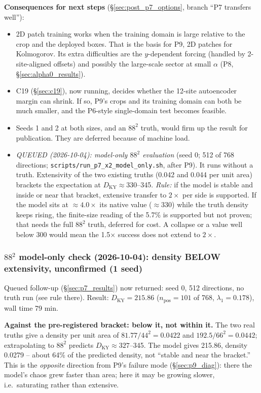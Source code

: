 \documentclass[11pt]{article}
\begin{document}
\textbf{Consequences for next steps} (\S\ref{sec:post_p7_options},
branch ``P7 transfers well''):
\begin{itemize}[leftmargin=*]
\item 2D patch training works when the training domain is large
  relative to the crop and the deployed boxes. That is the basis for
  P9, 2D patches for Kolmogorov. Its extra difficulties are the
  $y$-dependent forcing (handled by 2-site-aligned offsets) and possibly
  the large-scale sector at small $\alpha$ (P8, \S\ref{sec:alpha0_results}).
\item C19 (\S\ref{sec:c19}), now running, decides whether the 12-site
  autoencoder margin can shrink. If so, P9's crops and its training
  domain can both be much smaller, and the P6-style single-domain test
  becomes feasible.
\item Seeds 1 and 2 at both sizes, and an $88^2$ truth, would firm up
  the result for publication. They are deferred because of machine load.
\item \emph{QUEUED (2026-10-04): model-only $88^2$ evaluation} (seed 0;
  512 of 768 directions; \texttt{scripts/run\_p7\_x2\_model\_only.sh},
  after P9). It runs without a truth. Extensivity of the two existing
  truths (0.042 and 0.044 per unit area) brackets the expectation at
  $D_{\mathrm{KY}}\approx330$--345.
  \emph{Rule:} if the model is stable and inside or near that bracket,
  extensive transfer to $2\times$ per side is supported. If the model
  sits at $\approx 4.0\times$ its native value ($\approx 330$) while the
  truth density keeps rising, the finite-size reading of the 5.7\% is
  supported but not proven; that needs the full $88^2$ truth, deferred
  for cost. A collapse or a value well below 300 would mean the
  1.5$\times$ success does not extend to $2\times$.
\end{itemize}

\subsubsection{$88^2$ model-only check (2026-10-04): density BELOW extensivity, unconfirmed (1 seed)}
\label{sec:p7_88_check}

Queued follow-up (\S\ref{sec:p7_results}) now returned: seed 0, 512
directions, no truth run (see rule there). Result:
$D_{\mathrm{KY}}=215.86$ ($n_{\mathrm{pos}}=101$ of 768,
$\lambda_1=0.178$), wall time 79 min.

\textbf{Against the pre-registered bracket: below it, not within it.}
The two real truths give a density per unit area of $81.77/44^2=0.0422$
and $192.5/66^2=0.0442$; extrapolating to $88^2$ predicts
$D_{\mathrm{KY}}\approx327$--345. The model gives 215.86, density
0.0279 -- about 64\% of the predicted density, not ``stable and near
the bracket.'' This is the \emph{opposite} direction from P9's failure
mode (\S\ref{sec:p9_diag}): there the model's chaos grew faster than
area; here it may be growing slower, i.e.\ saturating rather than
extensive.
\end{document}
